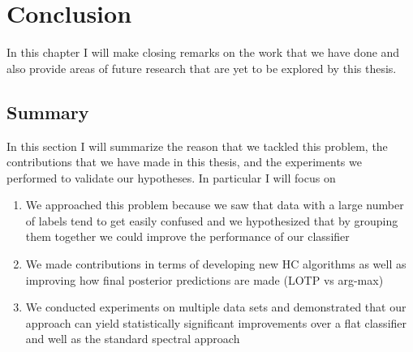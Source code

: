 \documentclass[../thesis.tex]{subfiles}
\begin{document}
\chapter{Conclusion}
In this chapter I will make closing remarks on the work that we have done and also provide areas of future research that are yet to be explored by this thesis.

\section{Summary}
In this section I will summarize the reason that we tackled this problem, the contributions that we have made in this thesis, and the experiments we performed to validate our hypotheses. In particular I will focus on
\begin{enumerate}
    \item We approached this problem because we saw that data with a large number of labels tend to get easily confused and we hypothesized that by grouping them together we could improve the performance of our classifier
    \item We made contributions in terms of developing new HC algorithms as well as improving how final posterior predictions are made (LOTP vs arg-max)
    \item We conducted experiments on multiple data sets and demonstrated that our approach can yield statistically significant improvements over a flat classifier and well as the standard spectral approach
\end{enumerate}
\end{document}

